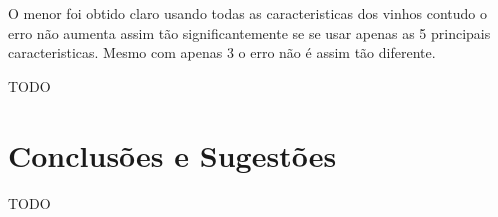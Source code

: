 \documentclass{article}
\begin{document}
O menor foi obtido claro usando todas as caracteristicas dos vinhos contudo o erro não aumenta assim tão significantemente se se usar apenas as 5 principais caracteristicas. Mesmo com apenas 3 o erro não é assim tão diferente.

{\color{red}TODO}

\newpage

\vspace*{\fill}
\section{Conclusões e Sugestões}
{\color{red}TODO}
\vspace*{\fill}

\newpage
\end{document}
